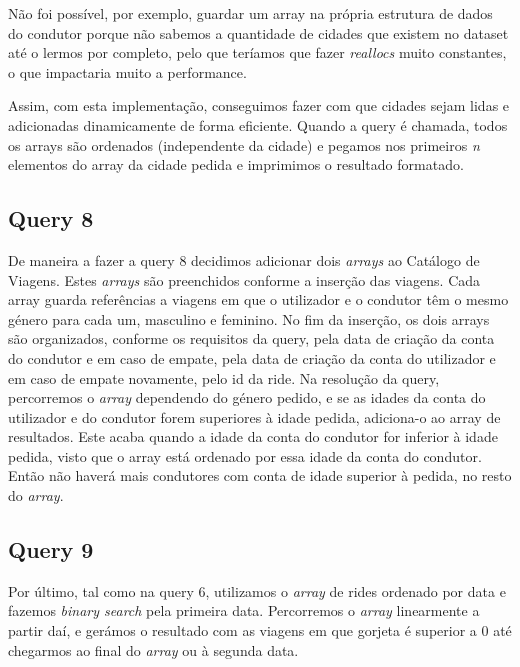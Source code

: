 \documentclass{article}
\begin{document}
            Não foi possível, por exemplo, guardar um array na própria estrutura de dados do condutor
            porque não sabemos a quantidade de cidades que existem no dataset até o lermos por completo,
            pelo que teríamos que fazer \emph{reallocs} muito constantes, o que impactaria muito a performance.

            Assim, com esta implementação, conseguimos fazer com que cidades sejam lidas e adicionadas dinamicamente
            de forma eficiente.
            Quando a query é chamada, todos os arrays são ordenados (independente da cidade) e
            pegamos nos primeiros \emph{n} elementos do array da cidade pedida e imprimimos o resultado formatado.
        \subsection{Query 8}
			De maneira a fazer a query 8 decidimos adicionar dois \textit{arrays} ao Catálogo de Viagens. 
            Estes \textit{arrays} são preenchidos conforme a inserção das viagens. 
            Cada array guarda referências a viagens em que
            o utilizador e o condutor têm o mesmo género para cada um, masculino e feminino. No fim da inserção, os dois
            arrays são organizados, conforme os requisitos da query, pela data de criação da conta do condutor e em caso 
            de empate, pela data de criação da conta do utilizador e em caso de empate novamente, pelo id da ride.
            Na resolução da query, percorremos o \textit{array} dependendo do género pedido, e se as idades
            da conta do utilizador e do condutor forem superiores à idade pedida, adiciona-o ao array de resultados.
            Este acaba quando a idade da conta do condutor for inferior à idade pedida, visto que
            o array está ordenado por essa idade da conta do condutor. Então não haverá mais condutores 
            com conta de idade superior à pedida, no resto do \textit{array}.
            
        \subsection{Query 9}
            Por último, tal como na query 6, utilizamos o \emph{array} de rides ordenado por data e fazemos
            \textit{binary search} pela primeira data. Percorremos o \emph{array} linearmente a partir daí, e gerámos o resultado com
            as viagens em que gorjeta é superior a 0 até chegarmos ao final do \textit{array} ou à segunda data.
\end{document}
